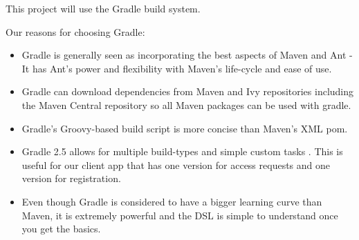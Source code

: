This project will use the Gradle build system.

Our reasons for choosing Gradle:
\begin{itemize}
	\item Gradle is generally seen as incorporating the best aspects of Maven and Ant -  It has Ant’s power and flexibility with Maven’s life-cycle and ease of use. \cite{Farcic2014, Timosin2013}
	\item Gradle can download dependencies from Maven and Ivy repositories including the Maven Central repository so all Maven packages can be used with gradle. \cite{GradleDocChap8}
	\item Gradle's Groovy-based build script is more concise than Maven's XML pom. \cite{Farcic2014}
	\item Gradle 2.5 allows for multiple build-types and simple custom tasks \cite{GradleChap55}. This is useful for our client app that has one version for access requests and one version for registration.
	\item Even though Gradle is considered to have a bigger learning curve than Maven, it is extremely powerful \cite{Timosin2013} and the DSL is simple to understand once you get the basics. \cite{Farcic2014}
	
\end{itemize}


